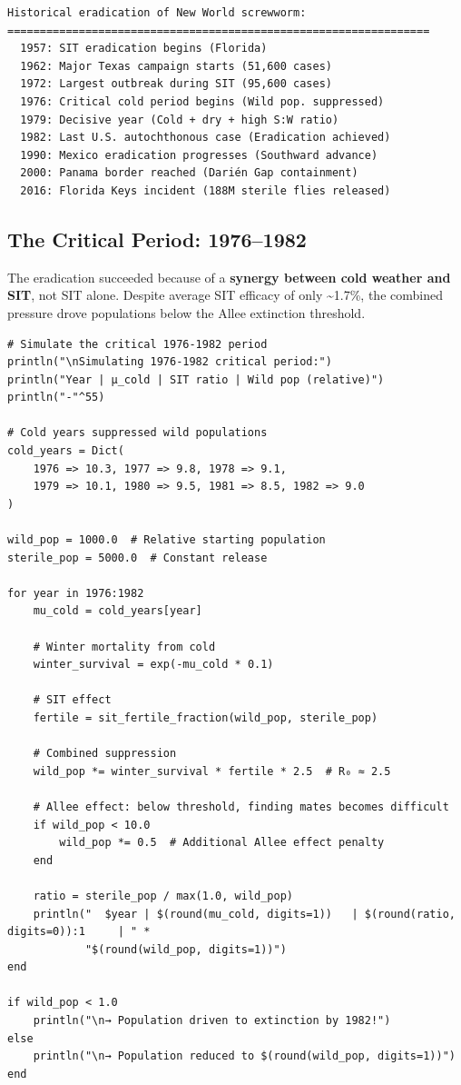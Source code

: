 \begin{verbatim}
Historical eradication of New World screwworm:
=================================================================
  1957: SIT eradication begins (Florida)
  1962: Major Texas campaign starts (51,600 cases)
  1972: Largest outbreak during SIT (95,600 cases)
  1976: Critical cold period begins (Wild pop. suppressed)
  1979: Decisive year (Cold + dry + high S:W ratio)
  1982: Last U.S. autochthonous case (Eradication achieved)
  1990: Mexico eradication progresses (Southward advance)
  2000: Panama border reached (Darién Gap containment)
  2016: Florida Keys incident (188M sterile flies released)
\end{verbatim}



\subsection{The Critical Period: 1976–1982}



\label{17060890573645779378}{}


The eradication succeeded because of a \textbf{synergy between cold weather and SIT}, not SIT alone. Despite average SIT efficacy of only {\textasciitilde}1.7\%, the combined pressure drove populations below the Allee extinction threshold.




\begin{verbatim}
# Simulate the critical 1976-1982 period
println("\nSimulating 1976-1982 critical period:")
println("Year | µ_cold | SIT ratio | Wild pop (relative)")
println("-"^55)

# Cold years suppressed wild populations
cold_years = Dict(
    1976 => 10.3, 1977 => 9.8, 1978 => 9.1,
    1979 => 10.1, 1980 => 9.5, 1981 => 8.5, 1982 => 9.0
)

wild_pop = 1000.0  # Relative starting population
sterile_pop = 5000.0  # Constant release

for year in 1976:1982
    mu_cold = cold_years[year]

    # Winter mortality from cold
    winter_survival = exp(-mu_cold * 0.1)

    # SIT effect
    fertile = sit_fertile_fraction(wild_pop, sterile_pop)

    # Combined suppression
    wild_pop *= winter_survival * fertile * 2.5  # R₀ ≈ 2.5

    # Allee effect: below threshold, finding mates becomes difficult
    if wild_pop < 10.0
        wild_pop *= 0.5  # Additional Allee effect penalty
    end

    ratio = sterile_pop / max(1.0, wild_pop)
    println("  $year | $(round(mu_cold, digits=1))   | $(round(ratio, digits=0)):1     | " *
            "$(round(wild_pop, digits=1))")
end

if wild_pop < 1.0
    println("\n→ Population driven to extinction by 1982!")
else
    println("\n→ Population reduced to $(round(wild_pop, digits=1))")
end
\end{verbatim}




